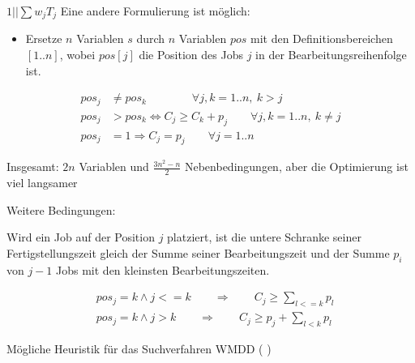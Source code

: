 \documentclass[hyperref={pdfpagelabels=false}]{beamer}
\begin{document}
\begin{frame}[allowframebreaks]{$1||\sum{w_jT_j}$}
Eine andere Formulierung ist möglich:
\begin{itemize}
\item Ersetze $n$ Variablen $s$ durch $n$ Variablen $pos$ mit den Definitionsbereichen $[1..n]$, wobei $pos[j]$ die Position des Jobs $j$ in der Bearbeitungsreihenfolge ist.
\end{itemize}
\begin{block}{} \begin{align}
	pos_j & \not= pos_k\qquad\qquad \forall j,k=1..n,\ k>j \nonumber \\
	pos_j  & > pos_k \Leftrightarrow  C_j \ge C_k + p_j \qquad \forall j,k=1..n,\ k\not=j \nonumber \\
	pos_j  & = 1 \Rightarrow C_j=p_j \qquad \forall j=1..n \nonumber
\end{align} \end{block}
Insgesamt: $2n$ Variablen und $\frac{3n^2-n}{2}$ Nebenbedingungen, aber die Optimierung ist viel langsamer

\newpage
{\small
Weitere Bedingungen:

\vspace{10pt}
 Wird ein Job auf der Position $j$ platziert, ist die untere Schranke seiner Fertigstellungszeit gleich der Summe seiner Bearbeitungszeit und der Summe $p_i$ von $j-1$ Jobs mit den kleinsten Bearbeitungszeiten.
\begin{block}{}
\begin{align}
  & pos_j=k \wedge j<=k  \qquad \Rightarrow \qquad C_j \ge \sum_{l<=k} p_l \nonumber \\
  & pos_j=k \wedge j>k  \qquad \Rightarrow  \qquad C_j \ge p_j+\sum_{l<k} p_l \nonumber 
\end{align}
\end{block}
\vspace{8pt}
Mögliche Heuristik für das Suchverfahren WMDD ( \grqq)
}
\end{frame}
\end{document}

